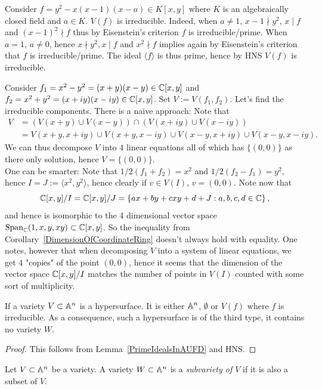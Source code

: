 \begin{example}
    Consider $f = y^2-x(x-1)(x-a)\in K[x,y]$ where $K$ is an algebraically closed field and $a\in K$. $V(f)$ is irreducible. Indeed, when $a \neq 1$, $x-1\nmid y^2$, $x\mid f$ and $(x-1)^2\nmid f$ thus by Eisenstein's criterion $f$ is irreducible/prime. When $a=1$, $a\neq0$, hence $x\nmid y^2,x\mid f$ and $x^2\nmid f $ implies again by Eisenstein's criterion that $f$ is irreducible/prime. The ideal $\langle f\rangle$ is thus prime, hence by HNS $V(f)$ is irreducible.   
\end{example}
\begin{example}
    Consider $f_1=x^2-y^2 =(x+y)(x-y)\in \mathbb{C}[x,y]$ and $f_2=x^2+y^2=(x+iy)(x-iy)\in\mathbb{C}[x,y]$. Set $V:=V(f_1,f_2)$. Let's find the irreducible components. There is a naive approach: Note that 
    \begin{align*}
        V&=(V(x+y)\cup V(x-y))\cap(V(x+iy)\cup V(x-iy))\\ &=V(x+y,x+iy)\cup V(x+y,x-iy)\cup V(x-y,x+iy)\cup V(x-y,x-iy).
    \end{align*}
    We can thus decompose $V$ into $4$ linear equations all of which has $\{(0,0)\}$ as there only solution, hence $V=\{(0,0)\}$.\\ One can be smarter: Note that $1/2(f_1+f_2) = x^2$ and $1/2(f_2-f_1)=y^2$, hence $I = J := \langle x^2,y^2\rangle$, hence clearly if $v\in V(I)$, $v=(0,0)$. Note now that 
    $$\mathbb{C}[x,y]/I=\mathbb{C}[x,y]/J = \left\{ ax+by+cxy+d + J : a,b,c,d\in\mathbb{C} \right\},$$
    and hence is isomorphic to the 4 dimensional vector space $\mathrm{Span}_{\mathbb{C}}(1,x,y,xy)\subset \mathbb{C}[x,y]$. So the inequality from Corollary~\ref{DimensionOfCoordinateRing} doesn't always hold with equality. One notes, however that when decomposing $V$ into a system of linear equations, we get $4$ "copies" of the point $(0,0)$, hence it seems that the dimension of the vector space $\mathbb{C}[x,y]/I$ matches the number of points in $V(I)$ counted with some sort of multiplicity.    
\end{example}
\begin{corollary}
    If a variety $V\subset \mathbb{A}^n$ is a hypersurface. It is either $\mathbb{A}^n$, $\emptyset$ or $V(f)$ where $f$ is irreducible. As a consequence, such a hypersurface is of the third type, it contains no variety $W$.  
\end{corollary} 
\begin{proof}
    This follows from Lemma~\ref{PrimeIdealsInAUFD} and HNS.
\end{proof}
\begin{definition}
    Let $V\subset \mathbb{A}^n$ be a variety. A variety $W\subset \mathbb{A}^n$ is a \textit{subvariety of $V$} if it is also a subset of $V$. 
\end{definition}
